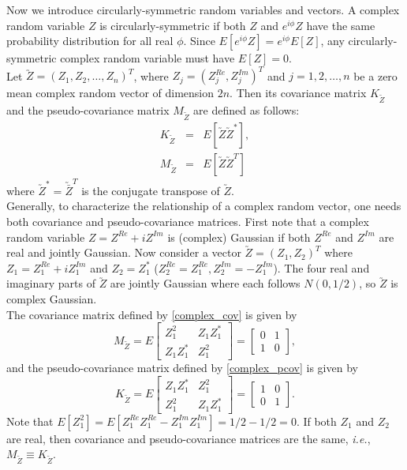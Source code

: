 Now we introduce circularly-symmetric random variables and vectors. A complex random variable $Z$ is circularly-symmetric if both $Z$ and $e^{i\phi} Z$ have the same probability distribution for all real $\phi$.  Since $E[e^{i\phi}Z] = e^{i\phi}E[Z]$, any circularly-symmetric complex random variable must have $E[Z]=0$.\\

Let $\utilde{Z} = (Z_1, Z_2, \ldots, Z_n)^T$, where $Z_j = (Z_j^{Re}, Z_j^{Im})^T$ and $j=1,2,\ldots, n$ be a zero mean complex random vector of dimension $2n$. Then its covariance matrix $K_{\utilde{Z}}$ and the pseudo-covariance matrix $M_{\utilde{Z}}$ are defined as follows:
\begin{eqnarray}
\label{complex_cov}
K_{\utilde{Z}} &=& E[\utilde{Z}\utilde{Z}^*],\\
\label{complex_pcov}
M_{\utilde{Z}} &=& E[\utilde{Z}\utilde{Z}^T]
\end{eqnarray}
where $\utilde{Z}^* = \utilde{\bar{Z}}^T$ is the conjugate transpose of $\utilde{Z}$.\\

Generally, to characterize the relationship of a complex random vector, one needs both covariance and pseudo-covariance matrices. First note that a complex random variable $Z = Z^{Re} + iZ^{Im}$ is (complex) Gaussian if both $Z^{Re}$ and $Z^{Im}$ are real and jointly Gaussian. Now consider a vector $\utilde{Z}=(Z_1, Z_2)^T$ where $Z_1=Z_1^{Re }+i Z_1^{Im}$ and $Z_2=Z_1^*$ ($Z_2^{Re}=Z_1^{Re }, Z_2^{Im}=-Z_1^{Im}$). The four real and imaginary parts of $\utilde{Z}$ are jointly Gaussian where each follows $N(0,1/2)$, so $\utilde{Z}$ is complex Gaussian.\\

The covariance matrix defined by \eqref{complex_cov} is given by
\[
M_{\utilde{Z}} = E \begin{bmatrix}
Z_1^2 & Z_1Z_1^*\\
Z_1Z_1^* & Z_1^2
\end{bmatrix} =
\begin{bmatrix}
0 & 1\\
1 & 0
\end{bmatrix},
\]
and the pseudo-covariance matrix defined by \eqref{complex_pcov} is given by
\[
K_{\utilde{Z}}= E \begin{bmatrix}
Z_1Z_1^*  & Z_1^2\\
Z_1^2     & Z_1Z_1^*
\end{bmatrix} =
\begin{bmatrix}
1 & 0\\
0 & 1
\end{bmatrix}.
\]
Note that $E[Z_1^2] = E[Z_1^{Re}Z_1^{Re}-Z_1^{Im}Z_1^{Im}] = 1/2 -1/2 = 0$. If both $Z_1$ and $Z_2$ are real, then covariance and pseudo-covariance matrices are the same, {\em i.e.}, $M_{\utilde{Z}} \equiv K_{\utilde{Z}}$. \\


